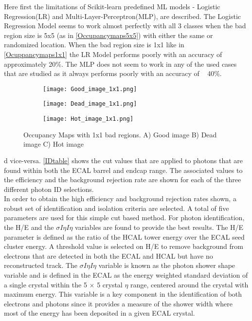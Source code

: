 Here first the limitations of Scikit-learn predefined ML models - Logistic Regression(LR) and Multi-Layer-Perceptron(MLP), are described. The Logistic Regression Model seems to work almost perfectly with all 3 classes when the bad region size is 5x5 (as in \autoref{Occupancymaps5x5}) with either the same or randomized location. When the bad region size is 1x1 like in \autoref{Ocuppancymaps1x1} the LR Model performs poorly with an accuracy of approximately 20\%. The MLP does not seem to work in any of the used cases that are studied as it always performs poorly with an accuracy of ~ 40\%.

\begin{figure}
\centering
\begin{subfigure}{.3\textwidth}
\texttt{[image: Good\_image\_1x1.png]}
\caption{}
\end{subfigure}
\begin{subfigure}{.3\textwidth}
\texttt{[image: Dead\_image\_1x1.png]}
\caption{}
\end{subfigure}
\begin{subfigure}{.3\textwidth}
\texttt{[image: Hot\_image\_1x1.png]}
\caption{}
\end{subfigure}
\vspace{1cm}
\caption{Occupancy Maps with 1x1 bad regions. A) Good image B) Dead image C) Hot image\label{Ocuppancymaps1x1}}
\end{figure}


d vice-versa. \autoref{IDtable} shows the cut values that are applied to photons that are found within both the ECAL barrel and endcap range. The associated values to the efficiency and the background rejection rate are shown for each of the three different photon ID selections.\\

In order to obtain the high efficiency and background rejection rates shown, a robust set of identification and isolation criteria are selected. A total of five parameters are used for this simple cut based method. For photon identification, the H/E and the $\sigma I\eta I\eta$ variables are found to provide the best results. The H/E parameter is defined as the ratio of the HCAL tower energy over the ECAL seed cluster energy. A threshold value is selected on H/E to remove background from electrons that are detected in both the ECAL and HCAL but have no reconstructed track\cite{egamma}. The $\sigma I\eta I\eta$ variable is known as the photon shower shape variable and is defined in the ECAL as the energy weighted standard deviation of a single crystal within the 5 $\times$ 5 crystal $\eta$ range, centered around the crystal with maximum energy\cite{showershape}. This variable is a key component in the identification of both electrons and photons since it provides a measure of the shower width where most of the energy has been deposited in a given ECAL crystal.

